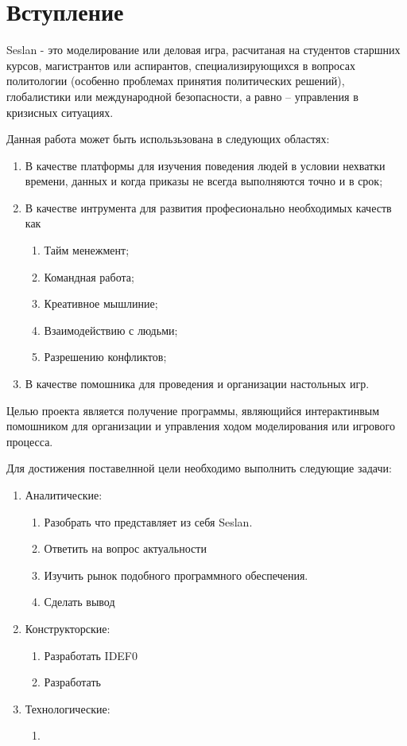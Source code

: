 \section{Вступление}
	Seslan - это моделирование или деловая игра, расчитаная на студентов старшних курсов, магистрантов или аспирантов, специализирующихся в вопросах политологии (особенно проблемах принятия политических решений), глобалистики или международной безопасности, а равно – управления в кризисных ситуациях.
	
	
	Данная работа может быть использьзована в следующих областях:
	\begin{enumerate}
		\item В качестве платформы для изучения поведения людей в условии нехватки времени, данных и когда приказы не всегда выполняются точно и в срок;
		\item В качестве интрумента для развития професионально необходимых качеств как 
			\begin{enumerate}
				\item Тайм менежмент;
				\item Командная работа;
				\item Креативное мышлиние;
				\item Взаимодействию с людьми;
				\item Разрешению конфликтов;
			\end{enumerate}
		\item В качестве помошника для проведения и организации настольных игр.
	\end{enumerate}
	
	Целью проекта является получение программы, являющийся интерактинвым помошником для организации и управления ходом моделирования или игрового процесса.
	
	Для достижения поставелнной цели необходимо выполнить следующие задачи:
	\begin{enumerate}
		\item Аналитические:
		\begin{enumerate}
			\item Разобрать что представляет из себя Seslan.
			\item Ответить на вопрос актуальности
			\item Изучить рынок подобного программного обеспечения.
			\item Сделать вывод
		\end{enumerate}
		\item Конструкторские:
		
		\begin{enumerate}
			\item Разработать IDEF0
			\item Разработать
			
		\end{enumerate}
		
		\item Технологические:
		\begin{enumerate}
			\item
		\end{enumerate}
	\end{enumerate}

